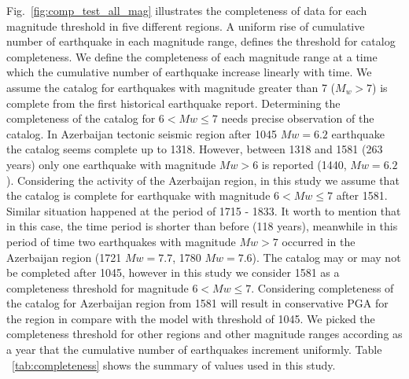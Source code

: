\noindent
Fig.~\ref{fig:comp_test_all_mag} illustrates the completeness of data for each magnitude threshold in five different regions. A uniform rise of cumulative number of earthquake in each magnitude range, defines the threshold for catalog completeness. We define the completeness of each magnitude range at a time which the cumulative number of earthquake increase linearly with time. We assume the catalog for earthquakes with magnitude greater than  7 ($M_w > 7$) is complete from the first historical earthquake report.  Determining the completeness of the catalog for $ 6 < Mw \leq 7 $ needs precise observation of the catalog. In Azerbaijan tectonic seismic region after 1045  $Mw = 6.2$ earthquake the catalog seems complete up to 1318. However, between 1318 and 1581 (263 years) only one earthquake with magnitude $Mw > 6$ is reported (1440,  $Mw = 6.2$ ). Considering the activity of the Azerbaijan region, in this study we assume that the catalog is complete for earthquake with magnitude $ 6 < Mw \leq 7 $ after 1581. Similar situation happened at the period of 1715 - 1833. It worth to mention that in this case, the time period is shorter than before (118 years), meanwhile in this period of time two earthquakes with magnitude $Mw>7$ occurred in the Azerbaijan region (1721 $Mw=7.7$, 1780 $Mw=7.6$). The catalog may or may not be completed after 1045, however in this study we consider 1581 as a completeness threshold for magnitude  $ 6 < Mw \leq 7 $. Considering completeness of the catalog for Azerbaijan region from 1581 will result in conservative PGA for the region in compare with the model with threshold of 1045. We picked the completeness threshold for other regions and other magnitude ranges according as a year that the cumulative number of earthquakes increment uniformly. Table ~\ref{tab:completeness} shows the summary of values used in this study.



